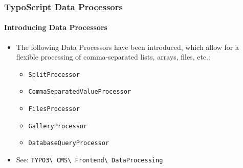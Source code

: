 \begin{frame}[fragile]
	\frametitle{TypoScript Data Processors}
	\framesubtitle{Introducing Data Processors}

	\lstset{basicstyle=\tiny\ttfamily}

	\begin{itemize}

		\item The following Data Processors have been introduced, which allow for a flexible processing
			of comma-separated lists, arrays, files, etc.:

			\begin{itemize}
				\item \texttt{SplitProcessor}
				\item \texttt{CommaSeparatedValueProcessor}
				\item \texttt{FilesProcessor}
				\item \texttt{GalleryProcessor}
				\item \texttt{DatabaseQueryProcessor}
			\end{itemize}

		\item See:
			\texttt{TYPO3\textbackslash
				CMS\textbackslash
				Frontend\textbackslash
				DataProcessing}

	\end{itemize}

\end{frame}


